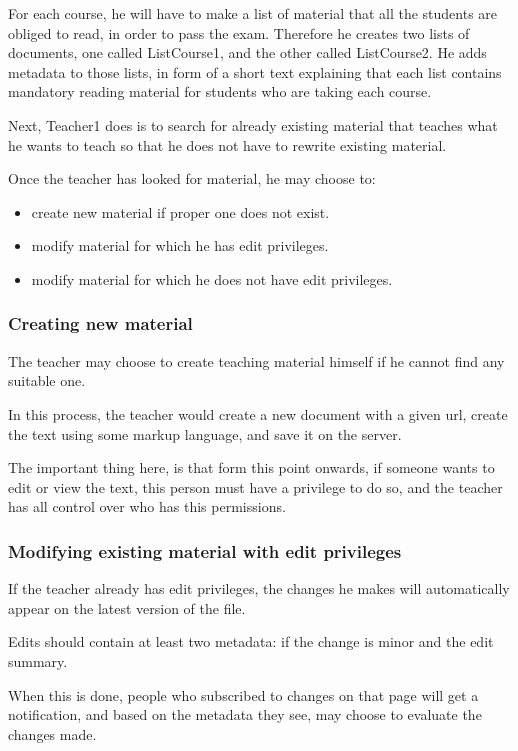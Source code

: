 \documentclass[12pt]{article}
\begin{document}
For each course, he will have to make a list of material that all the students are obliged to read, in order to pass the exam. Therefore he creates two lists of documents, one called ListCourse1, and the other called ListCourse2. He adds metadata to those lists, in form of a short text explaining that each list contains mandatory reading material for students who are taking each course.

Next, Teacher1 does is to search for already existing material that teaches what he wants to teach so that he does not have to rewrite existing material.

Once the teacher has looked for material, he may choose to:

\begin{itemize}
  \item create new material if proper one does not exist.
  \item modify material for which he has edit privileges.
  \item modify material for which he does not have edit privileges.
\end{itemize}

\subsubsection{Creating new material}

The teacher may choose to create teaching material himself if he cannot find any suitable one.

In this process, the teacher would create a new document with a given url, create the text using some markup language, and save it on the server.

The important thing here, is that form this point onwards, if someone wants to edit or view the text, this person must have a privilege to do so, and the teacher has all control over who has this permissions.

\subsubsection{Modifying existing material with edit privileges}

If the teacher already has edit privileges, the changes he makes will automatically appear on the latest version of the file.

Edits should contain at least two metadata: if the change is minor and the edit summary.

When this is done, people who subscribed to changes on that page will get a notification, and based on the metadata they see, may choose to evaluate the changes made.
\end{document}
